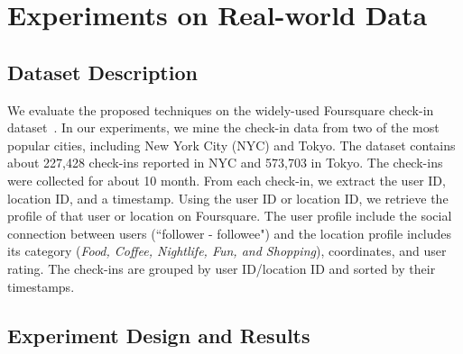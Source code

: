 \section{Experiments on Real-world Data} \label{sec:experiments}

\subsection{Dataset Description}

We evaluate the proposed techniques on the widely-used Foursquare check-in dataset~\cite{yang2015nationtelescope}. In our experiments, we mine the check-in data from two of the most popular cities, including New York City (NYC) and Tokyo. The dataset contains about 227,428 check-ins reported in NYC and 573,703 in Tokyo. The check-ins were collected for about 10 month. From each check-in, we extract the user ID, location ID, and a timestamp. Using the user ID or location ID, we retrieve the profile of that user or location on Foursquare. The user profile include the social connection between users (``follower - followee") and the location profile includes its category (\textit{Food, Coffee, Nightlife, Fun, and Shopping}), coordinates, and user rating. The check-ins are grouped by user ID/location ID and sorted by their timestamps.


\subsection{Experiment Design and Results}

